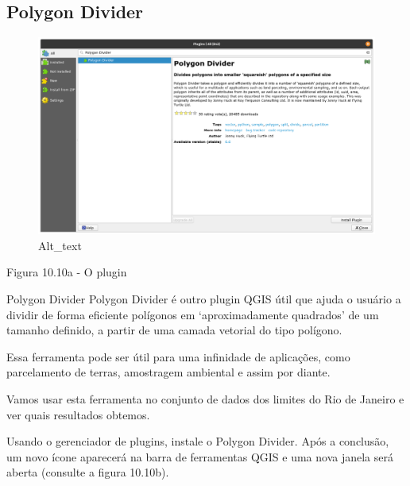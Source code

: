 \documentclass[
  portuguese,
]{krantz}
\begin{document}
\hypertarget{polygon-divider}{%
\subsection{\texorpdfstring{\textbf{Polygon Divider}}{Polygon Divider}}\label{polygon-divider}}

\begin{figure}
\centering
\includegraphics{media/modulo10/fig1010_a.png}
\caption{Alt\_text}
\end{figure}

Figura 10.10a - O plugin

Polygon Divider Polygon Divider é outro plugin QGIS útil que ajuda o usuário a dividir de forma eficiente polígonos em `aproximadamente quadrados' de um tamanho definido, a partir de uma camada vetorial do tipo polígono.

Essa ferramenta pode ser útil para uma infinidade de aplicações, como parcelamento de terras, amostragem ambiental e assim por diante.

Vamos usar esta ferramenta no conjunto de dados dos limites do Rio de Janeiro e ver quais resultados obtemos.

Usando o gerenciador de plugins, instale o Polygon Divider. Após a conclusão, um novo ícone aparecerá na barra de ferramentas QGIS e uma nova janela será aberta (consulte a figura 10.10b).
\end{document}
